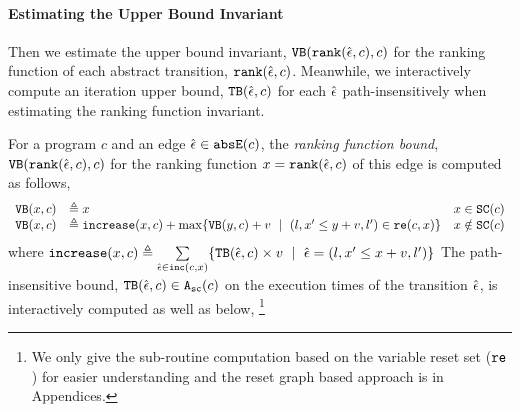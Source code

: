  \paragraph{Estimating the Upper Bound Invariant}
Then we estimate the upper bound invariant,  ${\mathtt{VB}}(\mathtt{rank}(\hat{\mathtt{\epsilon}{}}, c), c)$ for the ranking function of each abstract transition, $\mathtt{rank}(\hat{\mathtt{\epsilon}{}}, c)$. Meanwhile, we interactively compute an iteration upper bound,  ${\mathtt{TB}}(\hat{\mathtt{\epsilon}{}}, c)$  for each $\hat{\mathtt{\epsilon}{}}$ path-insensitively when estimating the ranking function invariant.
\begin{defn}
  \label{def:ranking_bound}
For a program $c$ and an edge $\hat{\mathtt{\epsilon}{}} \in \mathtt{abs}{\mathtt{E}}(c)$,
the \emph{ranking function bound}, 
${\mathtt{VB}}(\mathtt{rank}(\hat{\mathtt{\epsilon}{}}, c), c)$ for the ranking function $x = \mathtt{rank}(\hat{\mathtt{\epsilon}{}}, c)$
of this edge
is computed as follows,
{\small
  \[ 
\begin{array}{lll}
  \varinvar(x, c) & \triangleq x & x \in \scvar(c) \\
  \varinvar(x, c) & \triangleq \incrs(x, c) + \max\left\{\varinvar(y, c) + v ~\mid~ (l, x' \leq y + v, l') \in \reset(c, x) \right\} & x \notin \scvar(c)
\end{array}
\]
}
%
where $\mathtt{increase}(x, c) \triangleq \sum\limits_{\hat{\mathtt{\epsilon}{}} \in \mathtt{inc}(c, x)}\{{\mathtt{TB}}(\hat{\mathtt{\epsilon}{}}, c) \times v ~\mid~ \hat{\mathtt{\epsilon}{}} = (l, x' \leq x + v, l')\}$
The path-insensitive bound, ${\mathtt{TB}}(\hat{\mathtt{\epsilon}{}}, c) \in {\ensuremath{\mathtt{A_{sc}}}}(c)$  on the execution times of the transition $\hat{\mathtt{\epsilon}{}}$, is interactively computed as well as below,
\footnote{We only give the sub-routine computation based on the variable reset set ($\mathtt{re}$) for  easier understanding
and the reset graph based approach is in Appendices.
}
{\small
}
\end{defn}
